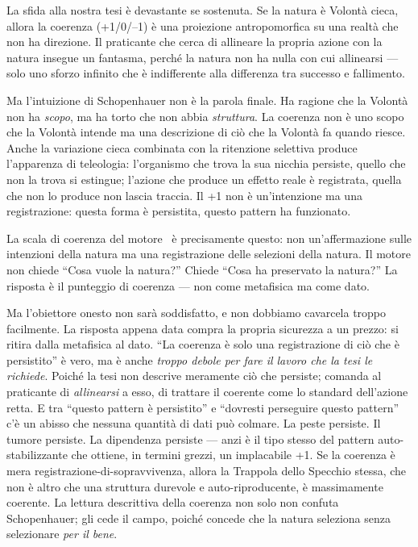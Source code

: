 La sfida alla nostra tesi \`e devastante se sostenuta. Se la natura
\`e Volont\`a cieca, allora la coerenza (+1/0/--1) \`e una proiezione
antropomorfica su una realt\`a che non ha direzione. Il praticante che
cerca di allineare la propria azione con la natura insegue un fantasma,
perch\'e la natura non ha nulla con cui allinearsi --- solo uno sforzo
infinito che \`e indifferente alla differenza tra successo e fallimento.

Ma l'intuizione di Schopenhauer non \`e la parola finale. Ha ragione
che la Volont\`a non ha \emph{scopo}, ma ha torto che non abbia
\emph{struttura}. La coerenza non \`e uno scopo che la Volont\`a
intende ma una descrizione di ci\`o che la Volont\`a fa quando riesce.
Anche la variazione cieca combinata con la ritenzione selettiva produce
l'apparenza di teleologia: l'organismo che trova la sua nicchia persiste,
quello che non la trova si estingue; l'azione che produce un effetto
reale \`e registrata, quella che non lo produce non lascia traccia. Il
+1 non \`e un'intenzione ma una registrazione: questa forma \`e
persistita, questo pattern ha funzionato.

La scala di coerenza del motore \physis\ \`e precisamente questo: non
un'affermazione sulle intenzioni della natura ma una registrazione delle
selezioni della natura. Il motore non chiede ``Cosa vuole la natura?''
Chiede ``Cosa ha preservato la natura?'' La risposta \`e il punteggio
di coerenza --- non come metafisica ma come dato.

Ma l'obiettore onesto non sar\`a soddisfatto, e non dobbiamo cavarcela troppo
facilmente. La risposta appena data compra la propria sicurezza a un prezzo:
si ritira dalla metafisica al dato. ``La coerenza \`e solo una registrazione di
ci\`o che \`e persistito'' \`e vero, ma \`e anche \emph{troppo debole per fare
il lavoro che la tesi le richiede}. Poich\'e la tesi non descrive meramente
ci\`o che persiste; comanda al praticante di \emph{allinearsi} a esso, di
trattare il coerente come lo standard dell'azione retta. E tra ``questo pattern
\`e persistito'' e ``dovresti perseguire questo pattern'' c'\`e un abisso che
nessuna quantit\`a di dati pu\`o colmare. La peste persiste. Il tumore persiste.
La dipendenza persiste --- anzi \`e il tipo stesso del pattern auto-stabilizzante
che ottiene, in termini grezzi, un implacabile +1. Se la coerenza \`e mera
registrazione-di-sopravvivenza, allora la Trappola dello Specchio stessa, che
non \`e altro che una struttura durevole e auto-riproducente, \`e massimamente
coerente. La lettura descrittiva della coerenza non solo non confuta
Schopenhauer; gli cede il campo, poich\'e concede che la natura seleziona senza
selezionare \emph{per il bene}.

